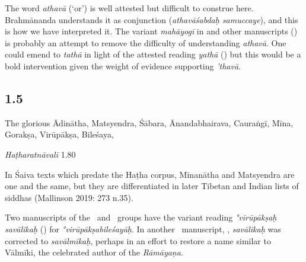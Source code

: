\begin{ekdosis}
\begin{testimonia}[hp01_004]
\begin{versinnote}
\end{versinnote}

\end{testimonia}

\begin{philcomm}[hp01_004]   
The word \emph{athavā} (‘or’) is well attested but difficult to construe here. Brahmānanda understands it as conjunction (\emph{athavāśabdaḥ samuccaye}), and this is how we have interpreted it. The variant \emph{mahāyogī} in \epsilonOne and other manuscripts () is probably an attempt to remove the difficulty of understanding \emph{athavā}. One could emend to \emph{tathā} in light of the attested reading \emph{yathā} () but this would be a bold intervention given the weight of evidence supporting \emph{’thavā}.   
\end{philcomm}

\subsection*{1.5}
\begin{translation}[hp01_005]
The glorious Ādinātha, Matsyendra, Śābara, Ānandabhairava, Cauraṅgī, Mīna, Gorakṣa, Virūpākṣa, Bileśaya,
\end{translation}

\begin{testimonia}[hp01_005]
\emph{Haṭharatnāvalī} 1.80

\begin{versinnote}
\end{versinnote}

\end{testimonia}

\begin{philcomm}[hp01_005]     
In Śaiva texts which predate the Haṭha corpus, Mīnanātha and Matsyendra are one and the same, but they are differentiated in later Tibetan and Indian lists of siddhas (Mallinson 2019: 273 n.35).   

Two manuscripts of the \textalpha\ and \textdelta\ groups have the variant reading \emph{°virūpākṣaḥ savālikaḥ} () for \emph{°virūpākṣabileśayāḥ}. In another \textalpha\ manuscript, , \emph{savālikaḥ} was corrected to \emph{savālmikaḥ}, perhaps in an effort to restore a name similar to Vālmīki, the celebrated author of the \textit{Rāmāyaṇa}.
\end{philcomm}


\end{ekdosis}
